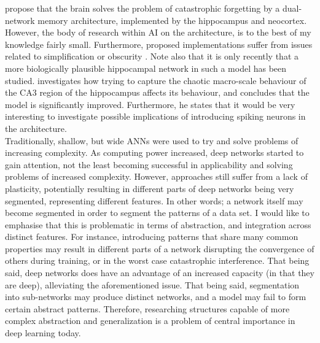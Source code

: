 \citet{McClelland1995} propose that the brain solves the problem of catastrophic forgetting by a dual-network memory architecture, implemented by the hippocampus and neocortex. However, the body of research within AI on the architecture, is to the best of my knowledge fairly small. Furthermore, proposed implementations suffer from issues related to simplification or obscurity \citep{French1997, French2001, Hattori2010, Hattori2014}. Note also that it is only recently that a more biologically plausible hippocampal network in such a model has been studied. \citet{Hattori2014} investigates how trying to capture the chaotic macro-scale behaviour of the CA3 region of the hippocampus affects its behaviour, and concludes that the model is significantly improved. Furthermore, he states that it would be very interesting to investigate possible implications of introducing spiking neurons in the architecture.
\\


Traditionally, shallow, but wide ANNs were used to try and solve problems of increasing complexity.
As computing power increased, deep networks started to gain attention, not the least becoming successful in applicability and solving problems of increased complexity. However, approaches still suffer from a lack of plasticity, potentially resulting in different parts of deep networks being very segmented, representing different features. In other words; a network itself may become segmented in order to segment the patterns of a data set. I would like to emphasise that this is problematic in terms of abstraction, and integration across distinct features. For instance, introducing patterns that share many common properties may result in different parts of a network disrupting the convergence of others during training, or in the worst case catastrophic interference.
That being said, deep networks does have an advantage of an increased capacity (in that they are deep), alleviating the aforementioned issue. That being said, segmentation into sub-networks may produce distinct networks, and a model may fail to form certain abstract patterns. Therefore, researching structures capable of more complex abstraction and generalization is a problem of central importance in deep learning today.
\\

